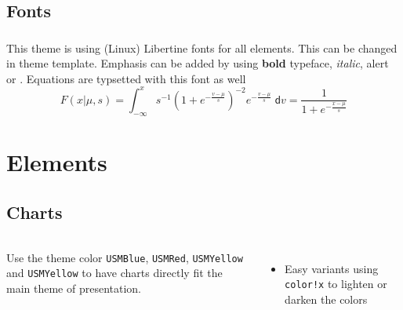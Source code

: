 \subsection{Fonts}

\begin{frame}
  \frametitle{\insertsectionhead}
  \framesubtitle{\insertsubsectionhead}
  This theme is using (Linux) Libertine fonts for all elements. This can be changed in theme template.
  \vfill
  Emphasis can be added by using \textbf{bold} typeface, \textit{italic},
  \alert{alert} or {\color{USMBlue}{simple colors}}.
  \vfill
  Equations are typsetted with this font as well
  \begin{equation*}
    F(x|\mu,s) = \int_{-\infty}^x s^{-1}\left(1+e^{-\frac{v-\mu}{s}}\right)^{-2} e^{-\frac{v-\mu}{s}}\;\mathsf{d}v = \frac{1}{1+e^{-\frac{x-\mu}{s}}}
  \end{equation*}
\end{frame}


\section{Elements}
\subsection{Charts}
\begin{frame}{\insertsectionhead}
	\framesubtitle{\insertsubsectionhead}
	\begin{columns}[c, onlytextwidth]
		Use the theme color \texttt{USMBlue}, \texttt{USMRed}, \texttt{USMYellow} and
		\texttt{USMYellow} to have charts directly fit the main theme of presentation.
		\vfill
		\begin{itemize}
			\item Easy variants using \texttt{color!x} to lighten or darken the colors
		\end{itemize}
		\hfill
		\center
	\end{columns}
\end{frame}

